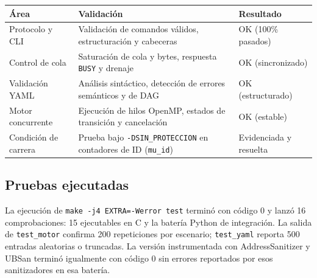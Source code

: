 \documentclass[12pt,a4paper]{article}
\newcommand{\code}[1]{\texttt{#1}}
\begin{document}
\begin{longtable}{@{}>{\raggedright\arraybackslash}p{3.4cm}>{\raggedright\arraybackslash}p{8cm}>{\raggedright\arraybackslash}p{3.6cm}@{}}
\toprule
\textbf{Área} & \textbf{Validación} & \textbf{Resultado} \\
\midrule
\endhead
Protocolo y CLI & Validación de comandos válidos, estructuración y cabeceras & OK (100\% pasados) \\[3pt]
Control de cola & Saturación de cola y bytes, respuesta \code{BUSY} y drenaje & OK (sincronizado) \\[3pt]
Validación YAML & Análisis sintáctico, detección de errores semánticos y de DAG & OK (estructurado) \\[3pt]
Motor concurrente & Ejecución de hilos OpenMP, estados de transición y cancelación & OK (estable) \\[3pt]
Condición de carrera & Prueba bajo \code{-DSIN\_PROTECCION} en contadores de ID (\code{mu\_id}) & Evidenciada y resuelta \\
\bottomrule
\end{longtable}

\subsection{Pruebas ejecutadas}

La ejecución de \code{make -j4 EXTRA=-Werror test} terminó con código 0 y lanzó 16 comprobaciones: 15 ejecutables en C y la batería Python de integración. La salida de \code{test\_motor} confirma 200 repeticiones por escenario; \code{test\_yaml} reporta 500 entradas aleatorias o truncadas. La versión instrumentada con AddressSanitizer y UBSan terminó igualmente con código 0 sin errores reportados por esos sanitizadores en esa batería.
\end{document}
